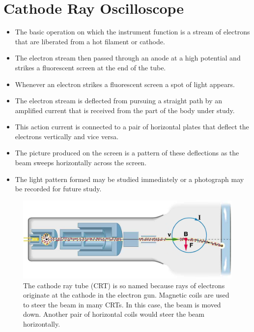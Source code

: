 \documentclass[12pt]{book}
\begin{document}
\section{Cathode Ray Oscilloscope}
\begin{itemize}

\item The basic operation on which the instrument function is a stream of electrons that are liberated from a hot filament or cathode.
\item The electron stream then passed through an anode at a high potential and strikes 	a fluorescent screen at the end of the tube.
\item Whenever an electron strikes a fluorescent screen a spot of light appears.
\item The electron stream is deflected from pursuing a straight path by an amplified current that is received from the part of the body under study.
\item This action current is connected to a pair of horizontal plates that deflect the electrons vertically and vice versa.
\item The picture produced on the screen is a pattern of these deflections as the beam
sweeps horizontally across the screen.

\item The light pattern formed may
be studied immediately or a photograph may be recorded for future
study.

\end{itemize}
\begin{figure}
    \centering
    \includegraphics[width=0.8\linewidth]{crtube.jpeg}
    \caption{The cathode ray tube (CRT) is so named because rays of electrons originate at the cathode in the electron gun. Magnetic coils are used to steer the beam in many CRTs. In this case, the beam is moved down. Another pair of horizontal coils would steer the beam horizontally.}
    \label{fig:cro}
\end{figure}
\end{document}
